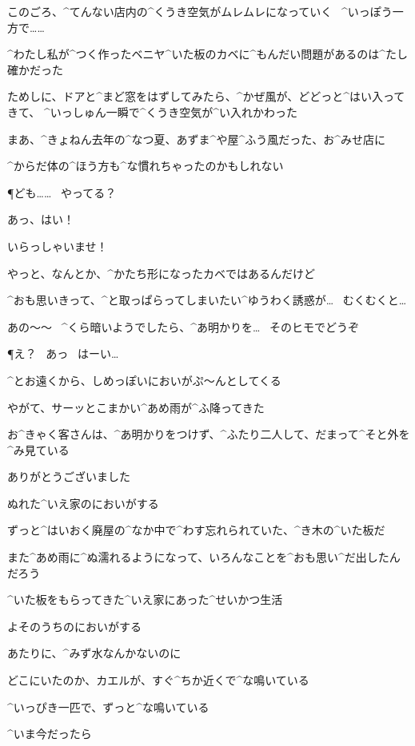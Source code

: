 \page
\A このごろ、^{てんない}{店内}の^{くうき}{空気}がムレムレになっていく
\ ^{いっぽう}{一方}で……

\A ^{わたし}{私}が^{つく}{作}ったベニヤ^{いた}{板}のカベに^{もんだい}{問題}があるのは^{たし}{確}かだった

\A ためしに、ドアと^{まど}{窓}をはずしてみたら、^{かぜ}{風}が、どどっと^{はい}{入}ってきて、
^{いっしゅん}{一瞬}で^{くうき}{空気}が^{い}{入}れかわった

\A まあ、^{きょねん}{去年}の^{なつ}{夏}、あずま^{や}{屋}^{ふう}{風}だった、お^{みせ}{店}に

\A ^{からだ}{体}の^{ほう}{方}も^{な}{慣}れちゃったのかもしれない

\page
\P ども……
\ やってる？

\A あっ、はい！

\A いらっしゃいませ！

\A やっと、なんとか、^{かたち}{形}になったカベではあるんだけど

\A ^{おも}{思}いきって、^{と}{取}っぱらってしまいたい^{ゆうわく}{誘惑}が…
\ むくむくと…

\page
\A あの〜〜
\ ^{くら}{暗}いようでしたら、^{あ}{明}かりを…
\ そのヒモでどうぞ

\P え？
\ あっ
\ はーい…

\page
\A ^{とお}{遠}くから、しめっぽいにおいがぷ〜んとしてくる

\A やがて、サーッとこまかい^{あめ}{雨}が^{ふ}{降}ってきた

\A お^{きゃく}{客}さんは、^{あ}{明}かりをつけず、^{ふたり}{二人}して、だまって^{そと}{外}を^{み}{見}ている

\page[124]
\A ありがとうございました

\page
\A ぬれた^{いえ}{家}のにおいがする

\A ずっと^{はいおく}{廃屋}の^{なか}{中}で^{わす}{忘}れられていた、^{き}{木}の^{いた}{板}だ

\A また^{あめ}{雨}に^{ぬ}{濡}れるようになって、いろんなことを^{おも}{思}い^{だ}{出}したんだろう

\page
\A ^{いた}{板}をもらってきた^{いえ}{家}にあった^{せいかつ}{生活}

\A よそのうちのにおいがする

\page
\A あたりに、^{みず}{水}なんかないのに

\A どこにいたのか、カエルが、すぐ^{ちか}{近}くで^{な}{鳴}いている

\page
\A ^{いっぴき}{一匹}で、ずっと^{な}{鳴}いている

\page
\A ^{いま}{今}だったら


